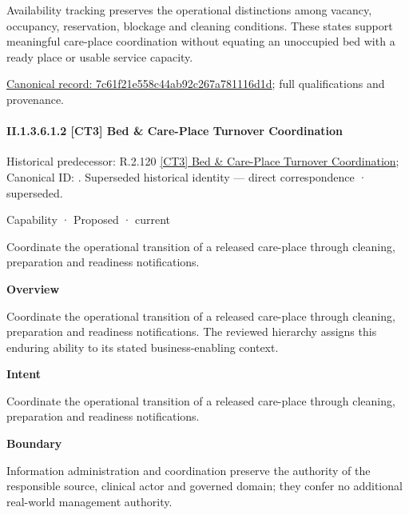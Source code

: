 Availability tracking preserves the operational distinctions among vacancy, occupancy, reservation, blockage and cleaning conditions. These states support meaningful care-place coordination without equating an unoccupied bed with a ready place or usable service capacity.


{\footnotesize \href{../../../../continuum/strategy/capability/feature/7c61f21e558c44ab92c267a781116d1d.md}{Canonical record: 7c61f21e558c44ab92c267a781116d1d}; full qualifications and provenance.}\par
\paragraph*{II.1.3.6.1.2 [CT3] Bed \& Care-Place Turnover Coordination}
\label{navigation:II.1.3.6.1.2}

{\small Historical predecessor: R.2.120 \hyperref[element:a50662edda954bc58c44184d84591d5b]{[CT3] Bed \& Care-Place Turnover Coordination}; Canonical ID: \texttt{}. Superseded historical identity — direct correspondence · superseded.}\par
\label{element:3c9464f9eae1415d8fa041bd1f3da4f2}
{\small Capability · Proposed · current}\par

Coordinate the operational transition of a released care-place through cleaning, preparation and readiness notifications.



\textbf{Overview}



Coordinate the operational transition of a released care-place through cleaning, preparation and readiness notifications. The reviewed hierarchy assigns this enduring ability to its stated business-enabling context.



\textbf{Intent}



Coordinate the operational transition of a released care-place through cleaning, preparation and readiness notifications.



\textbf{Boundary}



Information administration and coordination preserve the authority of the responsible source, clinical actor and governed domain; they confer no additional real-world management authority.


